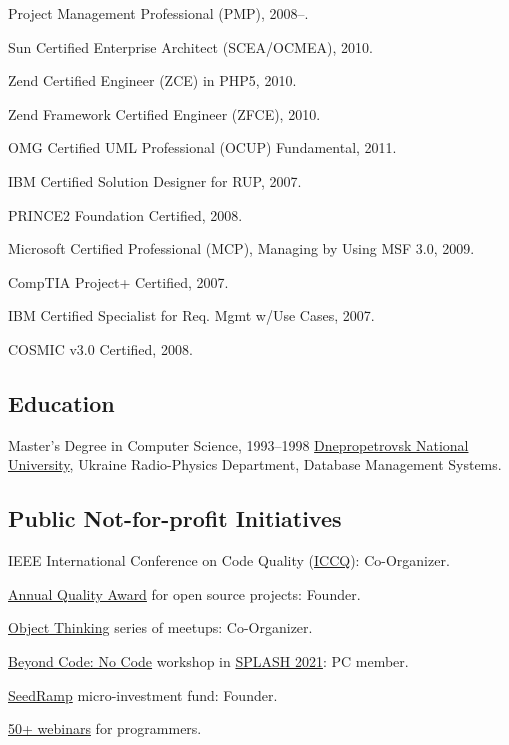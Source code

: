 \documentclass{yb}
\begin{document}
Project Management Professional (PMP), 2008--.

Sun Certified Enterprise Architect (SCEA/OCMEA), 2010.

Zend Certified Engineer (ZCE) in PHP5, 2010.

Zend Framework Certified Engineer (ZFCE), 2010.

OMG Certified UML Professional (OCUP) Fundamental, 2011.

IBM Certified Solution Designer for RUP, 2007.

PRINCE2 Foundation Certified, 2008.

Microsoft Certified Professional (MCP), Managing by Using MSF 3.0, 2009.

CompTIA Project+ Certified, 2007.

IBM Certified Specialist for Req. Mgmt w/Use Cases, 2007.

COSMIC v3.0 Certified, 2008.

\subsection*{Education}

\begin{samepage}
Master's Degree in Computer Science, 1993--1998\newline
\href{http://dnu.dp.ua/}{Dnepropetrovsk National University}, Ukraine\newline
Radio-Physics Department, Database Management Systems.
\end{samepage}

\subsection*{Public Not-for-profit Initiatives}

IEEE International Conference on Code Quality (\href{https://www.iccq.ru}{ICCQ}): Co-Organizer.

\href{https://www.yegor256.com/award.html}{Annual Quality Award} for open source projects: Founder.

\href{https://www.meetup.com/Object-Thinking/}{Object Thinking} series of meetups: Co-Organizer.

\href{https://2021.splashcon.org/home/bcnc-2021}{Beyond Code: No Code} workshop
  in \href{https://2021.splashcon.org/}{SPLASH 2021}: PC member.

\href{https:www.seedramp.com/}{SeedRamp} micro-investment fund: Founder.

\href{https://www.yegor256.com/webinars.html}{50+ webinars} for programmers.
\end{document}
